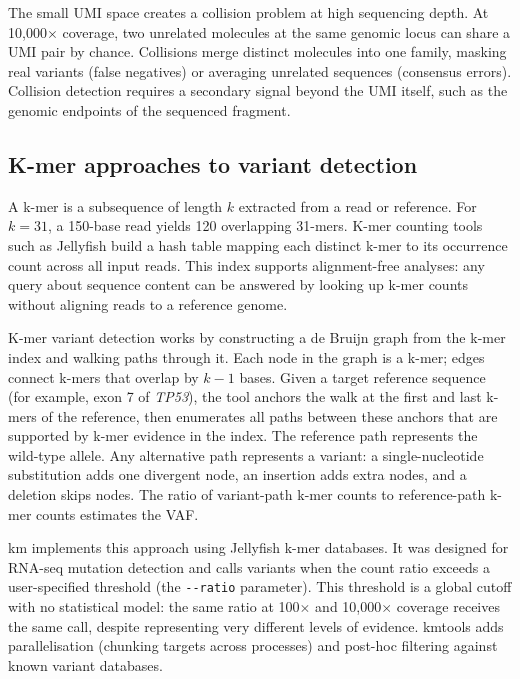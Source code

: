 The small UMI space creates a collision problem at high sequencing depth.
At 10{,}000$\times$ coverage, two unrelated molecules at the same genomic locus can share a UMI pair by chance.
Collisions merge distinct molecules into one family, masking real variants (false negatives) or averaging unrelated sequences (consensus errors).
Collision detection requires a secondary signal beyond the UMI itself, such as the genomic endpoints of the sequenced fragment.

\subsection{K-mer approaches to variant detection}
\label{sec:bg-kmer}

A k-mer is a subsequence of length $k$ extracted from a read or reference.
For $k = 31$, a 150-base read yields 120 overlapping 31-mers.
K-mer counting tools such as Jellyfish\autocite{Marcais11jellyfish} build a hash table mapping each distinct k-mer to its occurrence count across all input reads.
This index supports alignment-free analyses: any query about sequence content can be answered by looking up k-mer counts without aligning reads to a reference genome.

K-mer variant detection works by constructing a de Bruijn graph from the k-mer index and walking paths through it.
Each node in the graph is a k-mer; edges connect k-mers that overlap by $k{-}1$ bases.
Given a target reference sequence (for example, exon 7 of \emph{TP53}), the tool anchors the walk at the first and last k-mers of the reference, then enumerates all paths between these anchors that are supported by k-mer evidence in the index.
The reference path represents the wild-type allele.
Any alternative path represents a variant: a single-nucleotide substitution adds one divergent node, an insertion adds extra nodes, and a deletion skips nodes.
The ratio of variant-path k-mer counts to reference-path k-mer counts estimates the VAF.

km\autocite{Bourgey19km} implements this approach using Jellyfish k-mer databases.
It was designed for RNA-seq mutation detection and calls variants when the count ratio exceeds a user-specified threshold (the \texttt{-{}-ratio} parameter).
This threshold is a global cutoff with no statistical model: the same ratio at 100$\times$ and 10{,}000$\times$ coverage receives the same call, despite representing very different levels of evidence.
kmtools adds parallelisation (chunking targets across processes) and post-hoc filtering against known variant databases.

